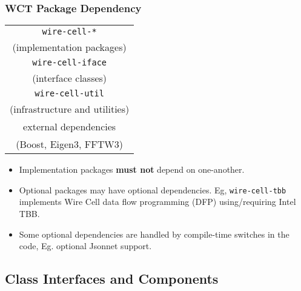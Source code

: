 \documentclass[xcolor=dvipsnames]{beamer}
\begin{document}
\begin{frame}[fragile]
  \frametitle{WCT Package Dependency}
  \begin{center}
    \begin{tabular}[h]{|c|}
      \hline
      \texttt{wire-cell-*}\\
      (implementation packages)\\
      \hline
      \texttt{wire-cell-iface} \\
      (interface classes) \\
      \hline
      \texttt{wire-cell-util} \\
      (infrastructure and utilities)\\
      \hline
      external dependencies\\
      (Boost, Eigen3, FFTW3)\\
      \hline
    \end{tabular}
  \end{center}

  \scriptsize
  \begin{itemize}
  \item Implementation packages \textbf{must not} depend on one-another.
  \item Optional packages may have optional dependencies.
    Eg, \texttt{wire-cell-tbb} implements Wire Cell data flow
    programming (DFP) using/requiring Intel TBB.
  \item Some optional dependencies are handled by compile-time
    switches in the code, Eg. optional Jsonnet support.
  \end{itemize}
\end{frame}

\subsection{Class Interfaces and Components}

\begin{frame}
  \tableofcontents[
  currentsection,
  currentsubsection,        
  subsectionstyle=show/shaded/hide]
\end{frame}
\end{document}
